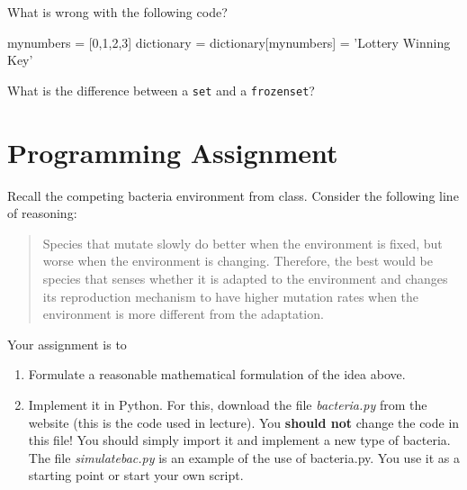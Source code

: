 \question
What is wrong with the following code?

\begin{python}
mynumbers = [0,1,2,3]
dictionary = {}
dictionary[mynumbers] = 'Lottery Winning Key'
\end{python}

\question
What is the difference between a \lstinline{set} and a \lstinline{frozenset}?

\chapter{Programming Assignment}

Recall the competing bacteria environment from class. Consider the following line of reasoning:

\begin{quote}
Species that mutate slowly do better when the environment is fixed, but worse when the environment is changing. Therefore, the best would be species that senses whether it is adapted to the environment and changes its reproduction mechanism to have higher mutation rates when the environment is more different from the adaptation.
\end{quote}

Your assignment is to 

\begin{enumerate}
\item Formulate a reasonable mathematical formulation of the idea above.
\item Implement it in Python. For this, download the file \textit{bacteria.py} from the website (this is the code used in lecture). You \textbf{should not} change the code in this file! You should simply import it and implement a new type of bacteria. The file \textit{simulatebac.py} is an example of the use of bacteria.py. You use it as a starting point or start your own script.
\end{enumerate} 


